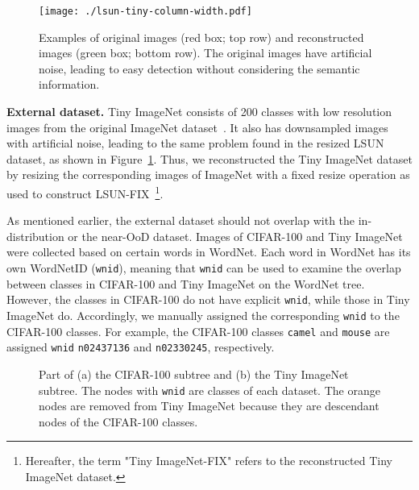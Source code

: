 \documentclass[preprint,12pt]{elsarticle}
\begin{document}
\begin{figure}[!t]
\vskip 0.1in
    \centering
    \texttt{[image: ./lsun-tiny-column-width.pdf]}
    \caption{Examples of original images (red box; top row) and reconstructed images (green box; bottom row). The original images have artificial noise, leading to easy detection without considering the semantic information.}
    \label{fig:lsun-tiny}
\vskip -0.1in
\end{figure}


\textbf{External dataset.}
Tiny ImageNet consists of 200 classes with low resolution images from the original ImageNet dataset~\citep{le2015tiny}. It also has downsampled images with artificial noise, leading to the same problem found in the resized LSUN dataset, as shown in Figure~\ref{fig:lsun-tiny}. Thus, we reconstructed the Tiny ImageNet dataset by resizing the corresponding images of ImageNet with a fixed resize operation as used to construct LSUN-FIX~\footnote{Hereafter, the term "Tiny ImageNet-FIX" refers to the reconstructed Tiny ImageNet dataset.}.

As mentioned earlier, the external dataset should not overlap with the in-distribution or the near-OoD dataset. Images of CIFAR-100 and Tiny ImageNet were collected based on certain words in WordNet. Each word in WordNet has its own WordNetID (\texttt{wnid}), meaning that \texttt{wnid} can be used to examine the overlap between classes in CIFAR-100 and Tiny ImageNet on the WordNet tree. However, the classes in CIFAR-100 do not have explicit \texttt{wnid}, while those in Tiny ImageNet do. Accordingly, we manually assigned the corresponding \texttt{wnid} to the CIFAR-100 classes. For example, the CIFAR-100 classes \texttt{camel} and \texttt{mouse} are assigned \texttt{wnid} \texttt{n02437136} and \texttt{n02330245}, respectively.

\begin{figure*}[!t]
    \centering
    \caption{Part of (a) the CIFAR-100 subtree and (b) the Tiny ImageNet subtree. The nodes with \texttt{wnid} are classes of each dataset. The orange nodes are removed from Tiny ImageNet because they are descendant nodes of the CIFAR-100 classes.}
    \label{fig:cifar-sub}
\vskip -0.1in
\end{figure*}
\end{document}
